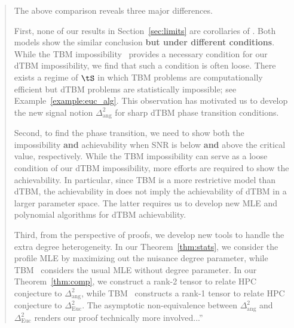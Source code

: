 \documentclass[11pt]{article}
\theoremstyle{definition}
\theoremstyle{definition}
\begin{document}
\begin{enumerate}[wide, labelwidth=!, labelindent=0pt]
\begin{quote}
The above comparison reveals three major differences. 

First, none of our results in Section~\ref{sec:limits} are corollaries of \cite{han2020exact}. Both models show the similar conclusion {\bf but under different conditions}. While the TBM impossibility~\citep{han2020exact} provides a necessary condition for our dTBM impossibility, we find that such a condition is often loose. There exists a regime of $\tS$ in which TBM problems are computationally efficient but dTBM problems are statistically impossible; see Example~\ref{example:euc_alg}. This observation has motivated us to develop the new signal notion $\Delta^2_{\text{ang}}$ for sharp dTBM phase transition conditions.  
     
 Second, to find the phase transition, we need to show both the impossibility {\bf and} achievability when SNR is below {\bf and} above the critical value, respectively. While the TBM impossibility can serve as a loose condition of our dTBM impossibility, more efforts are required to show the achievability. In particular, since TBM is a more restrictive model than dTBM, the achievability in \cite{han2020exact} does not imply the achievability of dTBM in a larger parameter space. The latter requires us to develop new MLE and polynomial algorithms for dTBM achievability.  %
    
Third, from the perspective of proofs, we develop new tools to handle the extra degree heterogeneity. In our Theorem~\ref{thm:stats}, we consider the profile MLE by maximizing out the nuisance degree parameter, while TBM~\citep{han2020exact} considers the usual MLE without degree parameter. In our Theorem~\ref{thm:comp}, we construct a rank-2 tensor to relate HPC conjecture to $\Delta^2_{\text{ang}}$, while TBM~\citep{han2020exact} constructs a rank-1 tensor to relate HPC conjecture to $\Delta^2_{\text{Euc}}$. The asymptotic non-equivalence between $\Delta^2_{\text{ang}}$ and $\Delta^2_{\text{Euc}}$ renders our proof technically more involved...''
   \end{quote}
   

\end{enumerate}
\end{document}
